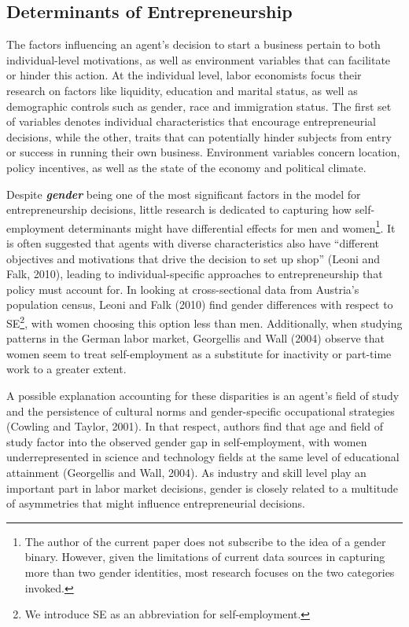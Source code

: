\subsection{Determinants of Entrepreneurship}

The factors influencing an agent’s decision to start a business pertain to both individual-level motivations, as well as environment variables that can facilitate or hinder this action. At the individual level, labor economists focus their research on factors like liquidity, education and marital status, as well as demographic controls such as gender, race and immigration status. The first set of variables denotes individual characteristics that encourage entrepreneurial decisions, while the other, traits that can potentially hinder subjects from entry or success in running their own business. Environment variables concern location, policy incentives, as well as the state of the economy and political climate. 


Despite \textbf{\textit{gender}} being one of the most significant factors in the model for entrepreneurship decisions, little research is dedicated to capturing how self-employment determinants might have differential effects for men and women\footnote{The author of the current paper does not subscribe to the idea of a gender binary. However, given the limitations of current data sources in capturing more than two gender identities, most research focuses on the two categories invoked.}. It is often suggested that agents with diverse characteristics also have “different objectives and motivations that drive the decision to set up shop” (Leoni and Falk, 2010), leading to individual-specific approaches to entrepreneurship that policy must account for. In looking at cross-sectional data from Austria’s population census, Leoni and Falk (2010) find gender differences with respect to SE\footnote{ We introduce SE as an abbreviation for self-employment.}, with women choosing this option less than men. Additionally, when studying patterns in the German labor market, Georgellis and Wall (2004) observe that women seem to treat self-employment as a substitute for inactivity or part-time work to a greater extent. 

A possible explanation accounting for these disparities is an agent’s field of study and the persistence of cultural norms and gender-specific occupational strategies (Cowling and Taylor, 2001). In that respect, authors find that age and field of study factor into the observed gender gap in self-employment, with women underrepresented in science and technology fields at the same level of educational attainment (Georgellis and Wall, 2004).  As industry and skill level play an important part in labor market decisions, gender is closely related to a multitude of asymmetries that might influence entrepreneurial decisions. 

